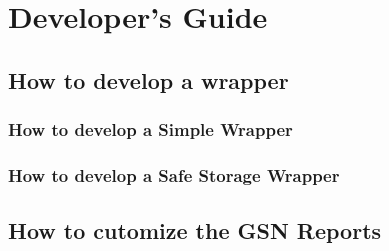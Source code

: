 \graphicspath{{chapters/ch-developer-guide/figures/}}

\chapter{Developer's Guide}

\section{How to develop a wrapper}

\subsection{How to develop a Simple Wrapper}

\subsection{How to develop a Safe Storage Wrapper}

\section{How to cutomize the GSN Reports}